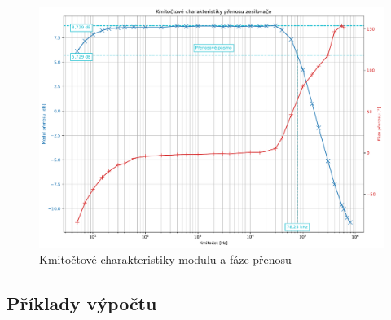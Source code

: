 \documentclass[a4paper, czech]{article}
\begin{document}
\begin{figure}[H]
    \centering
    \includegraphics[width=\textwidth]{grafy/graf_kmitoctova_charakteristika.pdf}
    \caption{Kmitočtové charakteristiky modulu a fáze přenosu}
\end{figure}

\subsection{Příklady výpočtu}
\end{document}
